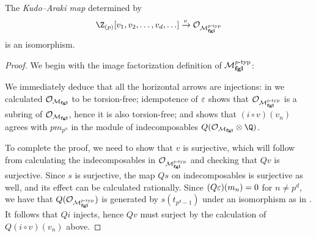 \begin{theorem}\label{KudoArakiIsomorphism}
The \textit{Kudo--Araki map} determined by  \[\Z_{(p)}[v_1, v_2, \ldots, v_d, \ldots] \xrightarrow{v} \sheaf O_{\moduli{fgl}^{\ptyp}}\] is an isomorphism.
\end{theorem}
\begin{proof}
We begin with the image factorization definition of $\mathcal{M}_{\mathbf{fgl}}^{\mathit{p}\text{-}\mathrm{typ}}$:
\begin{center}
\end{center}
We immediately deduce that all the horizontal arrows are injections: in  we calculated \(\mathcal{O}_{\mathcal{M}_{\mathbf{fgl}}}\) to be torsion-free; idempotence of \(\varepsilon\) shows that \(\mathcal{O}_{\mathcal{M}_{\mathbf{fgl}}^{\mathit{p}\text{-}\mathrm{typ}}}\) is a subring of \(\mathcal{O}_{\mathcal{M}_{\mathbf{fgl}}}\), hence it is also torsion-free; and  shows that \((i \circ v)(v_n)\) agrees with \(pm_{p^n}\) in the module of indecomposables \(Q(\sheaf O_{\moduli{fgl}} \otimes \Q)\).

To complete the proof, we need to show that \(v\) is surjective, which will follow from calculating the indecomposables in \(\mathcal{O}_{\mathcal{M}_{\mathbf{fgl}}^{\mathit{p}\text{-}\mathrm{typ}}}\) and checking that \(Qv\) is surjective.  Since \(s\) is surjective, the map \(Qs\) on indecomposables is surjective as well, and its effect can be calculated rationally.  Since \((Q\varepsilon)(m_n) = 0\) for \(n \ne p^d\), we have that \(Q(\mathcal{O}_{\mathcal{M}_{\mathbf{fgl}}^{\mathit{p}\text{-}\mathrm{typ}}})\) is generated by \(s(t_{p^d-1})\) under an isomorphism as in .  It follows that \(Qi\) injects, hence \(Qv\) must surject by the calculation of \(Q(i \circ v)(v_n)\) above.
\end{proof}

